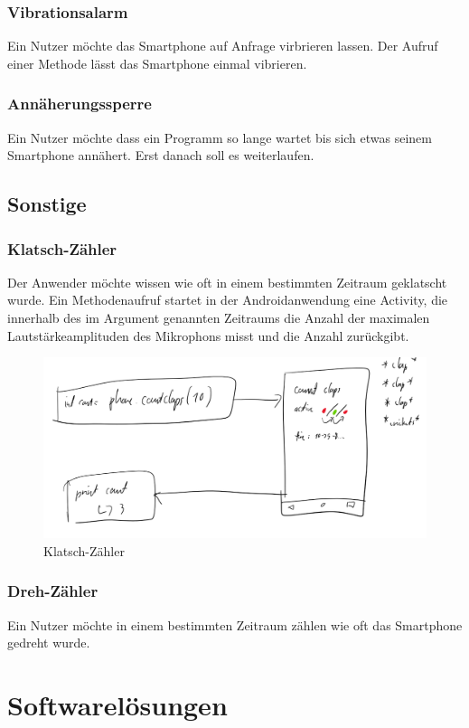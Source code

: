 \documentclass[11pt,a4paper]{report}
\begin{document}
\subsubsection*{Vibrationsalarm}
Ein Nutzer möchte das Smartphone auf Anfrage virbrieren lassen.
Der Aufruf einer Methode lässt das Smartphone einmal vibrieren.

\subsubsection*{Annäherungssperre}
Ein Nutzer möchte dass ein Programm so lange wartet bis sich etwas seinem Smartphone annähert.
Erst danach soll es weiterlaufen.


\subsection*{Sonstige}
\subsubsection*{Klatsch-Zähler}
Der Anwender möchte wissen wie oft in einem bestimmten Zeitraum geklatscht wurde.
Ein Methodenaufruf startet in der Androidanwendung eine Activity, die innerhalb des im Argument genannten Zeitraums die Anzahl der maximalen Lautstärkeamplituden des Mikrophons misst und die Anzahl zurückgibt.
\begin{figure}[htbp]
  \centering
  \includegraphics[width=.9\textwidth]{images/count_claps.png}
  \caption{Klatsch-Zähler}
  \label{fig:clap_count}
\end{figure}

\subsubsection*{Dreh-Zähler}
Ein Nutzer möchte in einem bestimmten Zeitraum zählen wie oft das Smartphone gedreht wurde.

\section*{Softwarelösungen}
\end{document}
